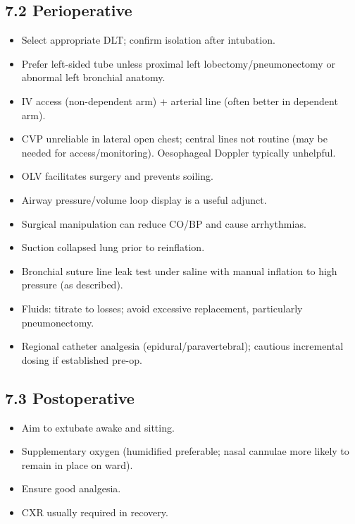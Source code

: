 \documentclass[11pt,a4paper]{article}
\begin{document}
\subsection{7.2 Perioperative}
\begin{itemize}[leftmargin=*, itemsep=2pt]
  \item Select appropriate DLT; confirm isolation after intubation.
  \item Prefer left-sided tube unless proximal left lobectomy/pneumonectomy or abnormal left bronchial anatomy.
  \item IV access (non-dependent arm) + arterial line (often better in dependent arm).
  \item CVP unreliable in lateral open chest; central lines not routine (may be needed for access/monitoring). Oesophageal Doppler typically unhelpful.
  \item OLV facilitates surgery and prevents soiling.
  \item Airway pressure/volume loop display is a useful adjunct.
  \item Surgical manipulation can reduce CO/BP and cause arrhythmias.
  \item Suction collapsed lung prior to reinflation.
  \item Bronchial suture line leak test under saline with manual inflation to high pressure (as described).
  \item Fluids: titrate to losses; avoid excessive replacement, particularly pneumonectomy.
  \item Regional catheter analgesia (epidural/paravertebral); cautious incremental dosing if established pre-op.
\end{itemize}

\subsection{7.3 Postoperative}
\begin{itemize}[leftmargin=*, itemsep=2pt]
  \item Aim to extubate awake and sitting.
  \item Supplementary oxygen (humidified preferable; nasal cannulae more likely to remain in place on ward).
  \item Ensure good analgesia.
  \item CXR usually required in recovery.
\end{itemize}
\end{document}
